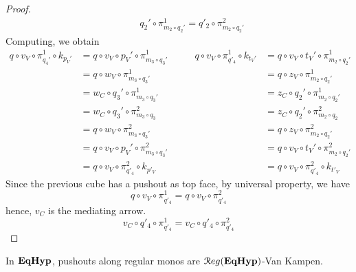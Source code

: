 \begin{proof}
\[\begin{split}
	\end{split}\qquad\begin{split}
		q_2' \circ \pi_{m_2 \circ q_2'}^1 = q'_2 \circ \pi_{m_2 \circ q_2'}^2
	\end{split}\]
	Computing, we obtain
	\[\begin{split}
		q \circ v_V \circ \pi_{q_4'}^1 \circ k_{p_V'} &= q \circ v_V \circ p_V' \circ \pi_{m_3 \circ q_3'}^1 \\
							      &= q \circ w_V \circ \pi_{m_3 \circ q_3'}^1 \\
							      &= w_C \circ q_3' \circ \pi_{m_3 \circ q_3'}^1 \\
							      &= w_C \circ q_3' \circ \pi_{m_3 \circ q_3}^2 \\
							      &= q \circ w_V \circ \pi_{m_3 \circ q_3'}^2 \\
							      &= q \circ v_V \circ p_V' \circ \pi_{m_3 \circ q_3'}^2 \\
							      &= q \circ v_V \circ \pi_{q'_4}^2 \circ k_{p'_V}
	\end{split}\qquad\begin{split}
		q \circ v_V \circ \pi_{q'_4}^1 \circ k_{t_V'} &= q \circ v_V \circ t_V' \circ \pi_{m_2 \circ q_2'}^1 \\
							      &= q \circ z_V \circ \pi_{m_2 \circ q_2'}^1 \\
							      &= z_C \circ q_2' \circ \pi_{m_2 \circ q_2'}^1 \\
							      &= z_C \circ q_2' \circ \pi_{m_2 \circ q_2}^2 \\
							      &= q \circ z_V \circ \pi_{m_2 \circ q_2'}^2 \\
							      &= q \circ v_V \circ t_V' \circ \pi_{m_2 \circ q_2'}^2 \\
							      &= q \circ v_V \circ \pi_{q'_4}^2 \circ k_{t'_V}
	\end{split}\]
	Since the previous cube has a pushout as top face, by universal property, we have
	\[
		q \circ v_V \circ \pi_{q'_4}^1 = q \circ v_V \circ \pi_{q'_4}^2
	\]
	hence, $v_C$ is the mediating arrow.
	\[
		v_C \circ q'_4 \circ \pi_{q'_4}^1 = v_C \circ q'_4 \circ \pi_{q'_4}^2
	\]
\end{proof}

\begin{lemma}\label{lemma:van_kampen}
	In $\textbf{\textup{EqHyp}}$, pushouts along regular monos are $\mathcal{R}eg(\textbf{\textup{EqHyp}})$-Van Kampen.
\end{lemma}

